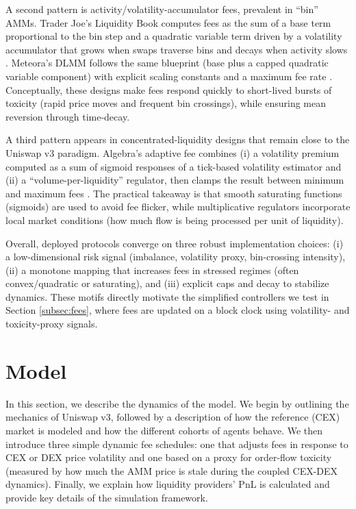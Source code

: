 \documentclass[11pt]{article}
\begin{document}
A second pattern is activity/volatility-accumulator fees, prevalent in ``bin'' AMMs. Trader Joe's Liquidity Book computes fees as the sum of a base term proportional to the bin step and a quadratic variable term driven by a volatility accumulator that grows when swaps traverse bins and decays when activity slows \cite{lfj_fees}. Meteora's DLMM follows the same blueprint (base plus a capped quadratic variable component) with explicit scaling constants and a maximum fee rate \cite{meteora_dlmm_docs}. Conceptually, these designs make fees respond quickly to short-lived bursts of toxicity (rapid price moves and frequent bin crossings), while ensuring mean reversion through time-decay.

A third pattern appears in concentrated-liquidity designs that remain close to the Uniswap v3 paradigm. Algebra's adaptive fee combines (i) a volatility premium computed as a sum of sigmoid responses of a tick-based volatility estimator and (ii) a ``volume-per-liquidity'' regulator, then clamps the result between minimum and maximum fees \cite{algebra_adaptive_fee_docs,algebra_tech_paper}. The practical takeaway is that smooth saturating functions (sigmoids) are used to avoid fee flicker, while multiplicative regulators incorporate local market conditions (how much flow is being processed per unit of liquidity).

Overall, deployed protocols converge on three robust implementation choices: (i) a low-dimensional risk signal (imbalance, volatility proxy, bin-crossing intensity), (ii) a monotone mapping that increases fees in stressed regimes (often convex/quadratic or saturating), and (iii) explicit caps and decay to stabilize dynamics. These motifs directly motivate the simplified controllers we test in Section \ref{subsec:fees}, where fees are updated on a block clock using volatility- and toxicity-proxy signals.


\section{Model}
In this section, we describe the dynamics of the model. We begin by outlining the mechanics of Uniswap v3, followed by a description of how the reference (CEX) market is modeled and how the different cohorts of agents behave. We then introduce three simple dynamic fee schedules: one that adjusts fees in response to CEX or DEX price volatility and one based on a proxy for order-flow toxicity (measured by how much the AMM price is stale during the coupled CEX-DEX dynamics). Finally, we explain how liquidity providers’ PnL is calculated and provide key details of the simulation framework.
\label{sec:model}
\end{document}
